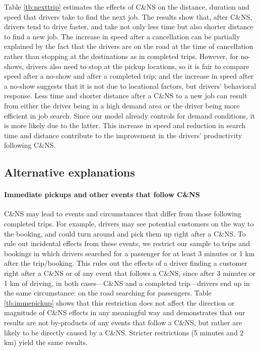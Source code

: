 \documentclass[reviewmode]{restud}
\begin{document}
Table \ref{tb:nexttrip} estimates the effects of C\&NS on the distance, duration and speed that drivers take to find the next job. The results show that, after C\&NS, drivers tend to drive faster, and take not only less time but also shorter distance to find a new job. The increase in speed after a cancellation can be partially explained by the fact that the drivers are on the road at the time of cancellation rather than stopping at the destinations as in completed trips. However, for no-shows, drivers also need to stop at the pickup locations, so it is fair to compare speed after a no-show and after a completed trip; and the increase in speed after a no-show suggests that it is not due to locational factors, but drivers' behavioral response. Less time and shorter distance after a C\&NS to a new job can result from either the driver being in a high demand area or the driver being more efficient in job search. Since our model already controls for demand conditions, it is more likely due to the latter. This increase in speed and reduction in search time and distance contribute to the improvement in the drivers' productivity following C\&NS.

\subsection{Alternative explanations}

\paragraph{Immediate pickups and other events that follow C\&NS} C\&NS may lead to events and circumstances that differ from those following completed trips. For example, drivers may see potential customers on the way to the booking, and could turn around and pick them up right after a C\&NS. 
To rule out incidental effects from these events, we restrict our sample to trips and bookings in which drivers searched for a passenger for at least 3 minutes or 1 km after the trip/booking. This rules out the effects of a driver finding a customer right after a C\&NS or of any event that follows a C\&NS, since after 3 minutes or 1 km of driving, in both cases---C\&NS and a completed trip---drivers end up in the same circumstance: on the road searching for passengers. Table \ref{tb:immepickup} shows that this restriction does not affect the direction or magnitude of C\&NS effects in any meaningful way and demonstrates that our results are not by-products of any events that follow a C\&NS, but rather are likely to be directly caused by a C\&NS. Stricter restrictions (5 minutes and 2 km) yield the same results.
\end{document}
